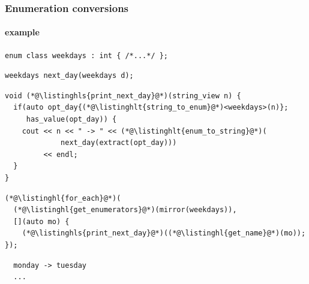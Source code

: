 \documentclass[compress,table,xcolor=table]{beamer}
\begin{document}
\begin{frame}[fragile]
  \frametitle{Enumeration conversions}
  \framesubtitle{example}
  \begin{lstlisting}[language=c++2x,basicstyle=\scriptsize\ttfamily]
enum class weekdays : int { /*...*/ };
  \end{lstlisting}
  \begin{lstlisting}[language=c++2x,basicstyle=\scriptsize\ttfamily]
weekdays next_day(weekdays d);
  \end{lstlisting}
  \begin{lstlisting}[language=c++2x,basicstyle=\footnotesize\ttfamily]
void (*@\listinghls{print_next_day}@*)(string_view n) {
  if(auto opt_day{(*@\listinghlt{string_to_enum}@*)<weekdays>(n)};
     has_value(opt_day)) {
    cout << n << " -> " << (*@\listinghlt{enum_to_string}@*)(
             next_day(extract(opt_day)))
         << endl;
  }
}
  \end{lstlisting}
  \begin{lstlisting}[language=c++2x,basicstyle=\scriptsize\ttfamily]
(*@\listinghl{for_each}@*)(
  (*@\listinghl{get_enumerators}@*)(mirror(weekdays)),
  [](auto mo) {
    (*@\listinghls{print_next_day}@*)((*@\listinghl{get_name}@*)(mo));
});
  \end{lstlisting}
  \smaller
  \begin{verbatim}
  monday -> tuesday
  ...
  \end{verbatim}
\end{frame}
\end{document}
